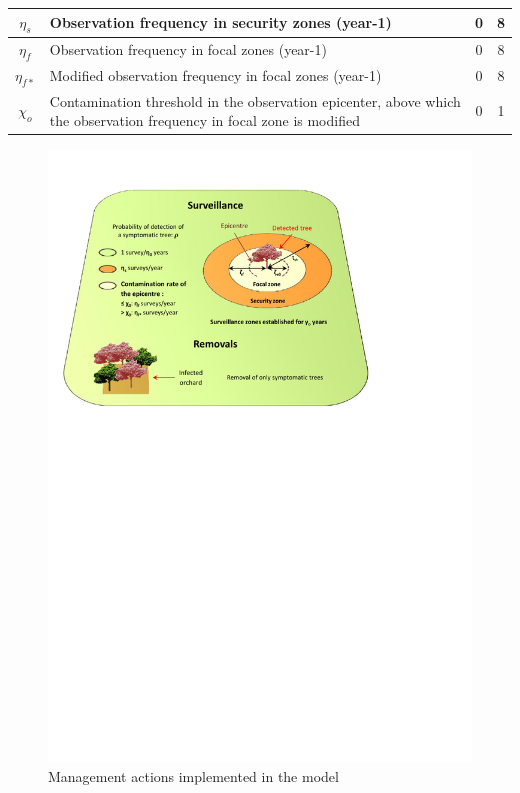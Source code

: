\begin{table}[htbp]
\begin{tabular}{|c|p{33.785em}|c|c|}
		\midrule
		$\eta_{s}$    & Observation frequency in security zones (year-1) & 0     & 8 \\
		\midrule
		$\eta_{f}$    & Observation frequency in focal zones (year-1) & 0     & 8 \\
		\midrule
		$\eta_{f*}$   & Modified observation frequency in focal zones (year-1) & 0     & 8 \\
		\midrule
		$\chi_{o}$    & Contamination threshold in the observation epicenter, above which the observation frequency in focal zone is modified & 0     & 1 \\
		\bottomrule
	\end{tabular}%
	\label{tab:tableparameters}%
\end{table}%

\begin{figure}[!ht]
	\centering
\includegraphics[trim = 0cm 16cm 4cm 1cm, clip, width=\textwidth]{Figures_Warping_paras_de_gestion.pdf}
 \caption{Management actions implemented in the model}\label{fig:schemagestion}
\end{figure}

